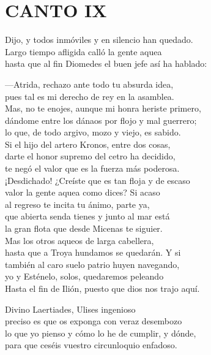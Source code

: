 \bnum
\section*{\centering\textbf{CANTO IX}}

\separator
\postart
{}
Dijo, y todos inmóviles y en silencio han quedado.\\
Largo tiempo afligida calló la gente aquea\\
hasta que al fin Diomedes el buen jefe así ha hablado:

---Atrida, rechazo ante todo tu absurda idea,\\
pues tal es mi derecho de rey en la asamblea.\\
Mas, no te enojes, aunque mi honra heriste primero,\\
dándome entre los dánaos por flojo y mal guerrero;\\
lo que, de todo argivo, mozo y viejo, es sabido.\\
Si el hijo del artero Kronos, entre dos cosas,\\
darte el honor supremo del cetro ha decidido,\\
te negó el valor que es la fuerza más poderosa.\\
¡Desdichado! ¿Creíste que es tan floja y de escaso\\
valor la gente aquea como dices? Si acaso\\
al regreso te incita tu ánimo, parte ya,\\
que abierta senda tienes y junto al mar está\\
la gran flota que desde Micenas te siguier.\\
Mas los otros aqueos de larga cabellera,\\
hasta que a Troya hundamos se quedarán. Y si\\
también al caro suelo patrio huyen navegando,\\
yo y Esténelo, solos, quedaremos peleando\\
Hasta el fin de Ilión, puesto que dios nos trajo aquí.\par
\poend
\separator
%
\postart
{}
Divino Laertiades, Ulises ingenioso\\
preciso es que os exponga con veraz desembozo\\
lo que yo pienso y cómo lo he de cumplir, y dónde,\\
para que ceséis vuestro circunloquio enfadoso.\\
